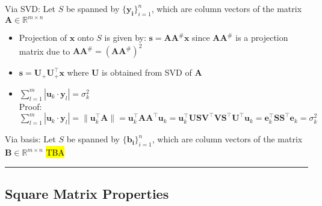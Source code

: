 Via SVD: Let $S$ be spanned by $\{\boldsymbol{y_i}\}_{i=1}^n$, which are column vectors of the matrix $\boldsymbol{A} \in \mathbb{R}^{m \times n}$
\begin{itemize}
    \item Projection of $\boldsymbol{x}$ onto $S$ is given by: $\boldsymbol{s} = \boldsymbol{A}\boldsymbol{A}^{\#}\boldsymbol{x}$ since $\boldsymbol{A}\boldsymbol{A}^{\#}$ is a projection matrix due to $\boldsymbol{A}\boldsymbol{A}^{\#} = (\boldsymbol{A}\boldsymbol{A}^{\#})^2$
    \item $\boldsymbol{s} = \boldsymbol{U}_{+} \boldsymbol{U}_{+}^\intercal \boldsymbol{x}$ where $\boldsymbol{U}$ is obtained from SVD of $\boldsymbol{A}$
    \item $\sum_{l=1}^m | \boldsymbol{u}_k \cdot \boldsymbol{y}_l |= \sigma_k^2$\\
    Proof:
    $\sum_{l=1}^m | \boldsymbol{u}_k \cdot \boldsymbol{y}_l |= \| \boldsymbol{u}_k^\intercal \boldsymbol{A} \| = \boldsymbol{u}_k^\intercal \boldsymbol{A} \boldsymbol{A}^\intercal \boldsymbol{u}_k = \boldsymbol{u}_k^\intercal \boldsymbol{U} \boldsymbol{S} \boldsymbol{V}^\intercal \boldsymbol{V} \boldsymbol{S}^\intercal \boldsymbol{U}^\intercal \boldsymbol{u}_k = \boldsymbol{e}_k^\intercal  \boldsymbol{S}  \boldsymbol{S}^\intercal \boldsymbol{e}_k = \sigma_k^2$
\end{itemize}
Via basis: Let $S$ be spanned by $\{\boldsymbol{b_i}\}_{i=1}^n$, which are column vectors of the matrix $\boldsymbol{B} \in \mathbb{R}^{m \times n}$
\hl{TBA}

{\color{black}\hrule height 0.001mm}

\subsection*{Square Matrix Properties}

